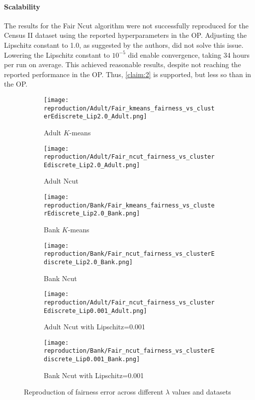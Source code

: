 \paragraph{Scalability}
The results for the Fair Ncut algorithm were not successfully reproduced for the Census II dataset using the reported hyperparameters in the OP. Adjusting the Lipschitz constant to 1.0, as suggested by the authors, did not solve this issue. Lowering the Lipschitz constant to $10^{-5}$ did enable convergence, taking 34 hours per run on average. This achieved reasonable results, despite not reaching the reported performance in the OP. Thus, \ref{claim:2} is supported, but less so than in the OP.

\begin{figure}
    \centering
    \begin{subfigure}{0.24\linewidth}
        \centering
        \texttt{[image: reproduction/Adult/Fair\_kmeans\_fairness\_vs\_clusterEdiscrete\_Lip2.0\_Adult.png]}
        \caption{Adult $K$-means}
        \label{fig:Adult_kmeans_reprod}
    \end{subfigure}
    \begin{subfigure}{0.24\linewidth}
        \centering
        \texttt{[image: reproduction/Adult/Fair\_ncut\_fairness\_vs\_clusterEdiscrete\_Lip2.0\_Adult.png]}
        \caption{Adult Ncut}
        \label{fig:Adult_ncut_reprod}
    \end{subfigure}
    \begin{subfigure}{0.24\linewidth}
        \centering
        \texttt{[image: reproduction/Bank/Fair\_kmeans\_fairness\_vs\_clusterEdiscrete\_Lip2.0\_Bank.png]}
        \caption{Bank $K$-means}
        \label{fig:Bank_kmeans_reprod}
    \end{subfigure}
    \begin{subfigure}{0.24\linewidth}
        \centering
        \texttt{[image: reproduction/Bank/Fair\_ncut\_fairness\_vs\_clusterEdiscrete\_Lip2.0\_Bank.png]}
        \caption{Bank Ncut}
        \label{fig:Bank_ncut_reprod}
    \end{subfigure}
    
    \begin{subfigure}{0.48\linewidth}
        \centering
        \texttt{[image: reproduction/Adult/Fair\_ncut\_fairness\_vs\_clusterEdiscrete\_Lip0.001\_Adult.png]}
        \caption{Adult Ncut with Lipschitz=0.001}
        \label{fig:Adult_ncut_reprod_Lipschitz}
    \end{subfigure}
    \begin{subfigure}{0.48\linewidth}
        \centering
        \texttt{[image: reproduction/Bank/Fair\_ncut\_fairness\_vs\_clusterEdiscrete\_Lip0.001\_Bank.png]}
        \caption{Bank Ncut with Lipschitz=0.001}
        \label{fig:Bank_ncut_reprod_Lipschitz}
    \end{subfigure}    
    \caption{Reproduction of fairness error across different $\lambda$ values and datasets}
    \label{fig:lambda_reprod_plots}
\end{figure}


